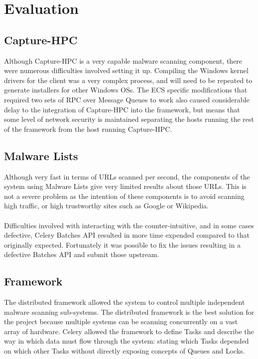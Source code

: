 \section{Evaluation}








\subsection{Capture-HPC}
Although Capture-HPC is a very capable malware scanning component, there were
numerous difficulties involved setting it up. Compiling the Windows kernel
drivers for the client was a very complex process, and will need to be repeated
to generate installers for other Windows OSs. The ECS specific modifications
that required two sets of RPC over Message Queues to work also caused considerable
delay to the integration of Capture-HPC into the framework, but means that some
level of network security is maintained separating the hosts running the rest of
the framework from the host running Capture-HPC.

\subsection{Malware Lists}
Although very fast in terms of URLs scanned per second, the components of the system using Malware Lists give very limited results about those URLs. This is not a severe problem as the intention of these components is to avoid scanning high traffic, or high trustworthy sites such as Google or Wikipedia.

\paragraph{}
Difficulties involved with interacting with the counter-intuitive, and in some cases defective, Celery Batches API resulted in more time expended compared to that originally expected. Fortunately it was possible to fix the issues resulting in a defective Batches API and submit those upstream.

\subsection{Framework}
The distributed framework allowed the system to control multiple independent malware scanning sub-systems.  The distributed framework is the best solution for the project because multiple systems can be scanning concurrently on a vast array of hardware. Celery allowed the framework to define Tasks and describe the way in which data must flow through the system: stating which Tasks depended on which other Tasks without directly exposing concepts of Queues and Locks.

